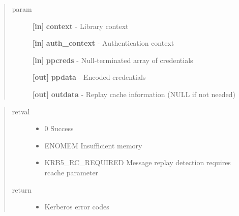 \documentclass[letterpaper,10pt,english]{sphinxmanual}
\begin{document}
\begin{fulllineitems}
\label{appdev/refs/api/krb5_mk_ncred:krb5_mk_ncred}
\end{fulllineitems}

\begin{quote}\begin{description}
\item[{param}] \leavevmode
\textbf{{[}in{]}} \textbf{context} - Library context

\textbf{{[}in{]}} \textbf{auth\_context} - Authentication context

\textbf{{[}in{]}} \textbf{ppcreds} - Null-terminated array of credentials

\textbf{{[}out{]}} \textbf{ppdata} - Encoded credentials

\textbf{{[}out{]}} \textbf{outdata} - Replay cache information (NULL if not needed)

\end{description}\end{quote}
\begin{quote}\begin{description}
\item[{retval}] \leavevmode\begin{itemize}
\item {} 
0   Success

\item {} 
ENOMEM   Insufficient memory

\item {} 
KRB5\_RC\_REQUIRED   Message replay detection requires rcache parameter

\end{itemize}

\item[{return}] \leavevmode\begin{itemize}
\item {} 
Kerberos error codes

\end{itemize}

\end{description}\end{quote}
\end{document}
